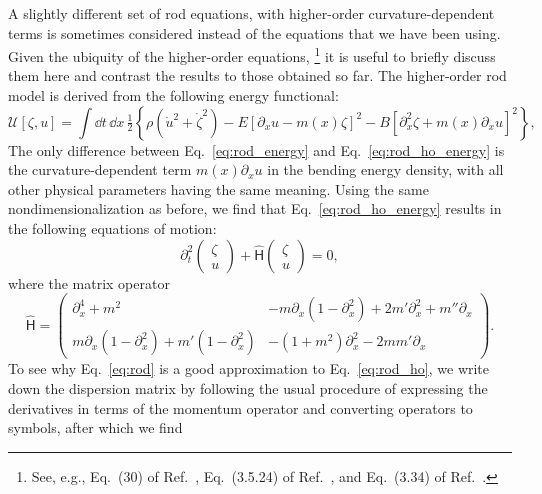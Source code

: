 A slightly different set of rod equations, with higher-order curvature-dependent terms is sometimes considered instead of the equations that we have been using.
Given the ubiquity of the higher-order equations,%
\footnote{See, e.g., Eq.~(30) of Ref.~\cite{morley1961}, Eq.~(3.5.24) of Ref.~\cite{graff1991}, and Eq.~(3.34) of Ref.~\cite{doyle2021}.}
it is useful to briefly discuss them here and contrast the results to those obtained so far.
The higher-order rod model is derived from the following energy functional:
%
\begin{equation}
  \mathscr{U}[\zeta, u] = \int \dd{t}\,\dd{x}\,\tfrac{1}{2}\left\{\rho\left(\dot{u}^{2} + \dot{\zeta}^{2}\right) - E\left[\partial_{x}u - m(x)\zeta\right]^{2} - B\left[\partial_{x}^{2}\zeta + m(x)\partial_{x}u\right]^{2}\right\},
  \label{eq:rod_ho_energy}
\end{equation}
%
The only difference between Eq.~\eqref{eq:rod_energy} and Eq.~\eqref{eq:rod_ho_energy} is the curvature-dependent term $m(x)\partial_{x}u$ in the bending energy density, with all other physical parameters having the same meaning.
Using the same nondimensionalization as before, we find that Eq.~\eqref{eq:rod_ho_energy} results in the following equations of motion:
%
\begin{equation}
  \partial_{t}^{2}
  \begin{pmatrix}
    \zeta\\
    u
  \end{pmatrix}
  +
  \widehat{\mathsf{H}}
  \begin{pmatrix}
    \zeta\\
    u
  \end{pmatrix}
  = 0,
  \label{eq:rod_ho}
\end{equation}
%
where the matrix operator
%
\begin{equation}
  \widehat{\mathsf{H}} =
  \begin{pmatrix}
  \partial_{x}^{4} + m^{2} & -m\partial_{x}(1 - \partial_{x}^{2}) + 2m'\partial_{x}^{2} + m''\partial_{x}\\
  m\partial_{x}(1 - \partial_{x}^{2}) + m'(1 - \partial_{x}^{2}) & -(1 + m^{2})\partial_{x}^{2} - 2mm'\partial_{x}
  \end{pmatrix}.
\end{equation}
%
To see why Eq.~\eqref{eq:rod} is a good approximation to Eq.~\eqref{eq:rod_ho},
we write down the dispersion matrix by following the usual procedure of expressing the derivatives in terms of the momentum operator and converting operators to symbols, after which we find%
